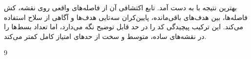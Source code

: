 \documentclass[10.5pt]{exam}
\begin{document}
بهترین نتیجه با
به دست آمد. تابع اکتشافی آن از فاصله‌های واقعی
روی نقشه، کش فاصله‌ها،
بین هدف‌های باقی‌مانده، پایین‌کران سه‌تایی هدف‌ها و آگاهی از سلاح استفاده می‌کند. این ترکیب پیچیدگی کد را در حد قابل توضیح نگه می‌دارد، اما تعداد بسط‌ها را در نقشه‌های ساده، متوسط و سخت از حدهای امتیاز کامل کمتر می‌کند.

\begin{thebibliography}{9}
\end{thebibliography}
\end{document}
